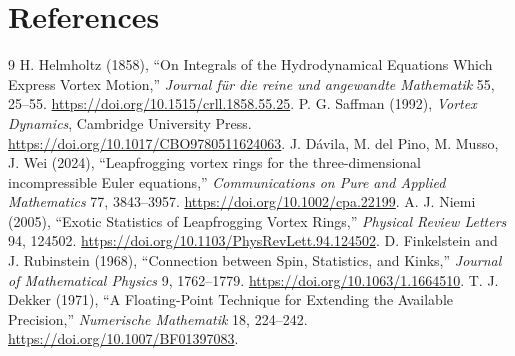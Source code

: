 \documentclass[10pt,a4paper]{article}
\begin{document}
\section{References}
\begin{thebibliography}{9}
 H. Helmholtz (1858), ``On Integrals of the Hydrodynamical Equations Which Express Vortex Motion,'' \emph{Journal f\"ur die reine und angewandte Mathematik} 55, 25--55. \url{https://doi.org/10.1515/crll.1858.55.25}.
 P. G. Saffman (1992), \emph{Vortex Dynamics}, Cambridge University Press. \url{https://doi.org/10.1017/CBO9780511624063}.
 J. D\'avila, M. del Pino, M. Musso, J. Wei (2024), ``Leapfrogging vortex rings for the three-dimensional incompressible Euler equations,'' \emph{Communications on Pure and Applied Mathematics} 77, 3843--3957. \url{https://doi.org/10.1002/cpa.22199}.
 A. J. Niemi (2005), ``Exotic Statistics of Leapfrogging Vortex Rings,'' \emph{Physical Review Letters} 94, 124502. \url{https://doi.org/10.1103/PhysRevLett.94.124502}.
 D. Finkelstein and J. Rubinstein (1968), ``Connection between Spin, Statistics, and Kinks,'' \emph{Journal of Mathematical Physics} 9, 1762--1779. \url{https://doi.org/10.1063/1.1664510}.
 T. J. Dekker (1971), ``A Floating-Point Technique for Extending the Available Precision,'' \emph{Numerische Mathematik} 18, 224--242. \url{https://doi.org/10.1007/BF01397083}.
\end{thebibliography}
\end{document}
